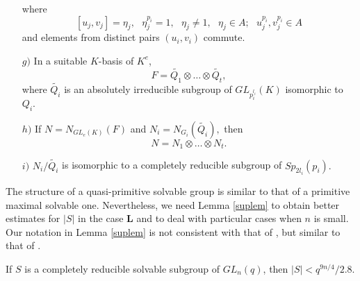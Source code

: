 \begin{Lem}
\begin{enumerate}[font=\normalfont]
where 
\begin{equation}\label{quv}
[u_j,v_j]=\eta_j, \text{ } \eta_j^{p_i}=1, \text{ } \eta_j \ne 1, \text{ } \eta_j \in A; \text{ } u_j^{p_i},v_j^{p_i} \in A
\end{equation}
and elements from distinct pairs $(u_i,v_i)$ commute.
\item[$g)$] In a suitable $K$-basis of $K^e$, 
$$F=\tilde{Q_1} \otimes \ldots \otimes \tilde{Q_t},$$
where $\tilde{Q_i}$ is an absolutely irreducible subgroup of $GL_{p_i^{l_i}}(K)$ isomorphic to $Q_i.$
\item[$h)$] If $N=N_{GL_e(K)}(F)$ and $N_i=N_{G_i}(\tilde{Q_i}),$ then
 $$N=N_1 \otimes \ldots \otimes N_t.$$
\item[$i)$] $N_i/\tilde{Q_i}$ is isomorphic to a completely reducible subgroup of $Sp_{2l_i}(p_i).$
\end{enumerate}
\end{Lem}

\begin{Rem}\label{pderem}
The structure of a quasi-primitive solvable group is similar to that of a primitive maximal solvable one.  Nevertheless, we need Lemma \ref{suplem} to obtain better estimates for $|S|$ in the case {\bf L} and to deal with  particular cases when $n$ is small. Our notation in Lemma \ref{suplem} is not consistent with that of \cite{sup}, but similar to that of \cite{short}.
\end{Rem}

\begin{Th} \label{lowboundsol}
If $S$ is a completely reducible solvable  subgroup of $GL_n(q)$, then $|S| < q^{9n/4}/2.8.$
\end{Th}


